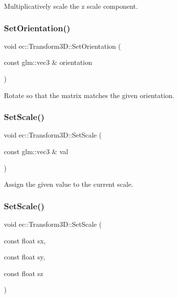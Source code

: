 Multiplicatively scale the z scale component. \mbox{\label{classec_1_1_transform3_d_a752381826edcad395fedaa4c9ced5da2}} 
\subsubsection{\texorpdfstring{Set\+Orientation()}{SetOrientation()}}
{\footnotesize\ttfamily void ec\+::\+Transform3\+D\+::\+Set\+Orientation (\begin{DoxyParamCaption}\item[{const glm\+::vec3 \&}]{orientation }\end{DoxyParamCaption})}

Rotate so that the matrix matches the given orientation. \mbox{\label{classec_1_1_transform3_d_ac60d767a4f53241ef68726530da0b984}} 
\subsubsection{\texorpdfstring{Set\+Scale()}{SetScale()}\hspace{0.1cm}{\footnotesize\ttfamily [1/2]}}
{\footnotesize\ttfamily void ec\+::\+Transform3\+D\+::\+Set\+Scale (\begin{DoxyParamCaption}\item[{const glm\+::vec3 \&}]{val }\end{DoxyParamCaption})}

Assign the given value to the current scale. \mbox{\label{classec_1_1_transform3_d_ac3a8b4e7a97700c4761bfadbd6a6b9ec}} 
\subsubsection{\texorpdfstring{Set\+Scale()}{SetScale()}\hspace{0.1cm}{\footnotesize\ttfamily [2/2]}}
{\footnotesize\ttfamily void ec\+::\+Transform3\+D\+::\+Set\+Scale (\begin{DoxyParamCaption}\item[{const float}]{sx,  }\item[{const float}]{sy,  }\item[{const float}]{sz }\end{DoxyParamCaption})}

